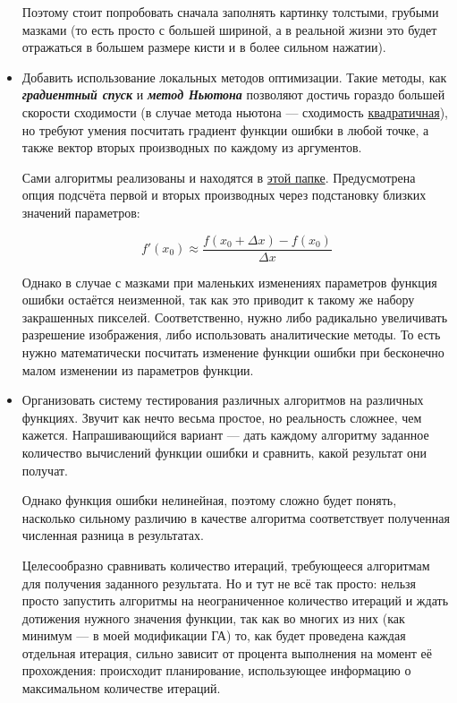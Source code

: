 \documentclass[11pt]{article}
\begin{document}
\begin{itemize}
                Поэтому стоит попробовать сначала заполнять картинку толстыми, грубыми мазками
                (то есть просто с большей шириной, а в реальной жизни это будет отражаться в большем размере кисти и в более сильном нажатии).
        \item Добавить использование локальных методов оптимизации.
                Такие методы, как \textbf\textit{{градиентный спуск}} и \textbf\textit{{метод Ньютона}} позволяют достичь гораздо большей скорости сходимости
                (в случае метода ньютона — сходимость \href{http://w.ict.nsc.ru/books/textbooks/akhmerov/mo_unicode/4.html}{квадратичная}),
                но требуют умения посчитать градиент функции ошибки в любой точке, а также вектор вторых производных по каждому из аргументов.

                Сами алгоритмы реализованы и находятся в \href{https://github.com/donRumata03/PowerfulGA/blob/master/other_optimization/local_optimization.cpp}{этой папке}.
                Предусмотрена опция подсчёта первой и вторых производных через подстановку близких значений параметров:

                \begin{equation}
                    f'(x_0) \approx \frac{f(x_0 + \Delta x) - f(x_0)}{\Delta x}
                \end{equation}

                Однако в случае с мазками при маленьких изменениях параметров функция ошибки остаётся неизменной, так как это приводит к такому же набору закрашенных пикселей.
                Соответственно, нужно либо радикально увеличивать разрешение изображения, либо использовать аналитические методы.
                То есть нужно математически посчитать изменение функции ошибки при бесконечно малом изменении из параметров функции.

        \item \label{item:testing_system} Организовать систему тестирования различных алгоритмов на различных функциях.
        Звучит как нечто весьма простое, но реальность сложнее, чем кажется.
        Напрашивающийся вариант — дать каждому алгоритму заданное количество вычислений функции ошибки и сравнить, какой результат они получат.

        Однако функция ошибки нелинейная, поэтому сложно будет понять,
        насколько сильному различию в качестве алгоритма соответствует полученная численная разница в результатах.

        Целесообразно сравнивать количество итераций, требующееся алгоритмам для получения заданного результата.
        Но и тут не всё так просто: нельзя просто запустить алгоритмы на неограниченное количество итераций
        и ждать дотижения нужного значения функции,
        так как во многих из них (как минимум — в моей модификации ГА) то,
        как будет проведена каждая отдельная итерация, сильно зависит от процента выполнения на момент её прохождения:
        происходит планирование,  использующее информацию о максимальном количестве итераций.



\end{itemize}
\end{document}
